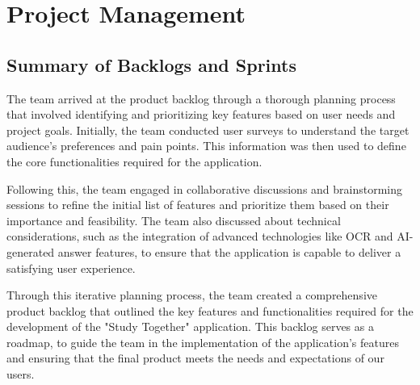 

\chapter{Project Management}\label{ch:project_management}

\section{Summary of Backlogs and Sprints}


The team arrived at the product backlog through a thorough planning process that involved identifying and prioritizing key features based on user needs and project goals. Initially, the team conducted user surveys to understand the target audience's preferences and pain points. This information was then used to define the core functionalities required for the application.

Following this, the team engaged in collaborative discussions and brainstorming sessions to refine the initial list of features and prioritize them based on their importance and feasibility. The team also discussed about technical considerations, such as the integration of advanced technologies like OCR and AI-generated answer features, to ensure that the application is capable to deliver a satisfying user experience.

Through this iterative planning process, the team created a comprehensive product backlog that outlined the key features and functionalities required for the development of the "Study Together" application. This backlog serves as a roadmap, to guide the team in the implementation of the application's features and ensuring that the final product meets the needs and expectations of our users.

